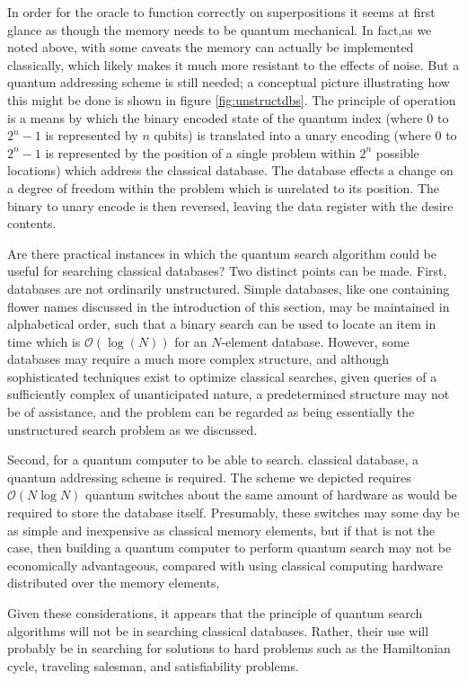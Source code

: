 In order for the oracle to function correctly on superpositions it seems at first glance as though the memory needs to be quantum mechanical. In fact,as we noted above, with some caveats the memory can actually be implemented classically, which likely makes it much more resistant to the effects of noise. But a quantum addressing scheme is still needed; a conceptual picture illustrating how this might be done is shown in figure \ref{fig:unstructdbs}. The principle of operation is a means by which the binary encoded state of the quantum index (where $0$ to $2^n-1$ is represented by $n$ qubits) is translated into a unary encoding (where $0$ to $2^n-1$ is represented by the position of a single problem within $2^n$ possible locations) which address the classical database. The database effects a change on a degree of freedom within the problem which is unrelated to its position. The binary to unary encode is then reversed, leaving the data register with the desire contents.

Are there practical instances in which the quantum search algorithm could be useful for searching classical databases? Two distinct points can be made. First, databases are not ordinarily unstructured. Simple databases, like one containing flower names discussed in the introduction of this section, may be maintained in alphabetical order, such that a binary search can be used to locate an item in time which is $\mathcal{O}(\log (N))$ for an $N$-element database. However, some databases may require a much more complex structure, and although sophisticated techniques exist to optimize classical searches, given queries of a sufficiently complex of unanticipated nature, a predetermined structure may not be of assistance, and the problem can be regarded as being essentially the unstructured search problem as we discussed.

Second, for a quantum computer to be able to search. classical database, a quantum addressing scheme is required. The scheme we depicted requires $\mathcal{O}(N\log N)$ quantum switches about the same amount of hardware as would be required to store the database itself. Presumably, these switches may some day be as simple and inexpensive as classical memory elements, but if that is not the case, then building a quantum computer to perform quantum search may not be economically advantageous, compared with using classical computing hardware distributed over the memory elements,

Given these considerations, it appears that the principle of quantum search algorithms will not be in searching classical databases. Rather, their use will probably be in searching for solutions to hard problems such as the Hamiltonian cycle, traveling salesman, and satisfiability problems.

